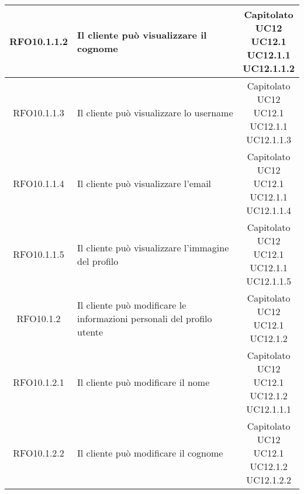 \begin{longtable}{|c|p{8cm}|c|}
\hypertarget{RFO10.1.1.2}{RFO10.1.1.2} & Il cliente può visualizzare il cognome & \makecell*{Capitolato\\UC12\\UC12.1\\UC12.1.1\\UC12.1.1.2} \\
\hline

\hypertarget{RFO10.1.1.3}{RFO10.1.1.3} & Il cliente può visualizzare lo username & \makecell*{Capitolato\\UC12\\UC12.1\\UC12.1.1\\UC12.1.1.3} \\
\hline

\hypertarget{RFO10.1.1.4}{RFO10.1.1.4} & Il cliente può visualizzare l'email & \makecell*{Capitolato\\UC12\\UC12.1\\UC12.1.1\\UC12.1.1.4} \\
\hline

\hypertarget{RFO10.1.1.5}{RFO10.1.1.5} &  Il cliente può visualizzare l'immagine del profilo & \makecell*{Capitolato\\UC12\\UC12.1\\UC12.1.1\\UC12.1.1.5} \\
\hline

\hypertarget{RFO10.1.2}{RFO10.1.2} &  Il cliente può modificare le informazioni personali del profilo utente &\makecell*{Capitolato\\UC12\\UC12.1\\UC12.1.2} \\
\hline

\hypertarget{RFO10.1.2.1}{RFO10.1.2.1} &  Il cliente può modificare il nome & \makecell*{Capitolato\\UC12\\UC12.1\\UC12.1.2\\UC12.1.1.1} \\
\hline

\hypertarget{RFO10.1.2.2}{RFO10.1.2.2} &  Il cliente può modificare il cognome & \makecell*{Capitolato\\UC12\\UC12.1\\UC12.1.2\\UC12.1.2.2} \\
\hline


\end{longtable}
